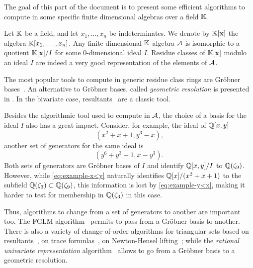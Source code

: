 The goal of this part of the document is to present some efficient
algorithms to compute in some specific finite dimensional algebras
over a field $\mathbb{K}$.

Let $\mathbb{K}$ be a field, and let $x_1,\ldots,x_n$ be indeterminates. We
denote by $\mathbb{K}[\mathbf{x}]$ the algebra $\mathbb{K}[x_1,\ldots,x_n]$. Any finite
dimensional $\mathbb{K}$-algebra $\mathcal{A}$ is isomorphic to a quotient
$\mathbb{K}[\mathbf{x}]/I$ for some $0$-dimensional ideal $I$. Residue classes of
$\mathbb{K}[\mathbf{x}]$ modulo an ideal $I$ are indeed a very good
representation of the elements of $\mathcal{A}$.

The most popular tools to compute in generic residue class rings are
Gröbner
bases~\cite{buchberger,cox+little+oshea,Cox-Little-OShea:UAG2005,faugere99,faugere02}.
An alternative to Gröbner bases, called \emph{geometric resolution} is
presented in \cite{giusti+lecerf+salvy01}. In the bivariate case,
resultants~\cite{cox+little+oshea,Cox-Little-OShea:UAG2005} are a
classic tool.

Besides the algorithmic tool used to compute in $\mathcal{A}$, the
choice of a basis for the ideal $I$ also has a great impact. Consider,
for example, the ideal of $\mathbb{Q}[x,y]$
\begin{equation}
  \label{eq:example-x<y}
  (x^2 + x + 1, y^3 - x)
  \text{,}
\end{equation}
another set of generators for the same ideal is
\begin{equation}
  \label{eq:example-y<x}
  (y^6 + y^3 + 1, x - y^3)
  \text{.}
\end{equation}
Both sets of generators are Gröbner bases of $I$ and identify
$\mathbb{Q}[x,y]/I$ to $\mathbb{Q}(\zeta_9)$. However, while \eqref{eq:example-x<y}
naturally identifies $\mathbb{Q}[x]/(x^2+x+1)$ to the subfield
$\mathbb{Q}(\zeta_3)\subset\mathbb{Q}(\zeta_9)$, this information is lost by
\eqref{eq:example-y<x}, making it harder to test for membership in
$\mathbb{Q}(\zeta_3)$ in this case.

Thus, algorithms to change from a set of generators to another are
important too. The FGLM algorithm~\cite{FGLM} permits to pass from a
Gröbner basis to another. There is also a variety of change-of-order
algorithms for triangular sets based on
resultants~\cite{boulier+lemaire+moreno01}, on trace
formulas~\cite{diaz+gonzalez01,pascal+schost06}, on Newton-Hensel
lifting~\cite{dahan+jin+moreno+schost08}; while the \emph{rational
  univariate representation} algorithm~\cite{rouiller99} allows to go
from a Gröbner basis to a geometric resolution.

